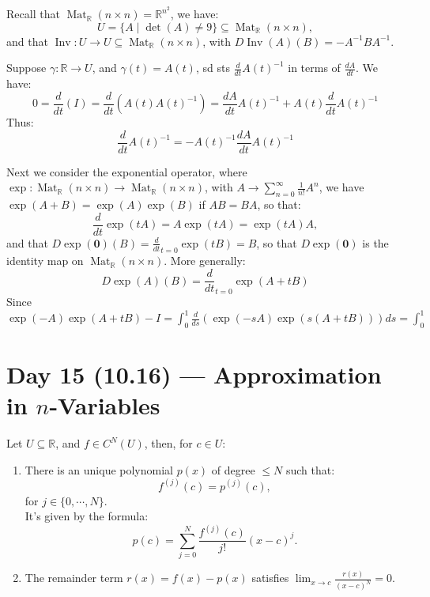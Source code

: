 \documentclass[11pt]{article}
\newenvironment{theorem}[1]{\begin{thmbox}{#1}{}}{\end{thmbox}}
\newenvironment{example}[1]{\begin{exbox}{#1}{}}{\end{exbox}}
\theoremstyle{quiet}
\theoremstyle{quietremark}
\begin{document}
Recall that $\operatorname{Mat}_\mathbb{R}(n\times n)=\mathbb{R}^{n^2}$, we have:
\[
U=\{A\mid\det(A)\ne 9\}\subseteq\operatorname{Mat}_\mathbb{R}(n\times n),
\]
and that $\operatorname{Inv}:U\to U\subseteq\operatorname{Mat}_\mathbb{R}(n\times n)$, with $D\operatorname{Inv}(A)(B)=-A^{-1}BA^{-1}$.
\begin{example}{}
Suppose $\gamma:\mathbb{R}\to U$, and $\gamma(t)=A(t)$, sd sts $\frac{d}{dt}A(t)^{-1}$ in terms of $\frac{dA}{dt}$.
We have:
\[
0=\frac{d}{dt}(I)=\frac{d}{dt}(A(t)A(t)^{-1})=\frac{dA}{dt}A(t)^{-1}+A(t)\frac{d}{dt}A(t)^{-1}
\]
Thus:
\[
\frac{d}{dt}A(t)^{-1}=-A(t)^{-1}\frac{dA}{dt}A(t)^{-1}
\]
\end{example}
Next we consider the exponential operator, where $\operatorname{exp}:\operatorname{Mat}_\mathbb{R}(n\times n)\to\operatorname{Mat}_\mathbb{R}(n\times n)$, with $A\to\sum_{n=0}^\infty\frac{1}{n!}A^n$, we have $\operatorname{exp}(A+B)=\operatorname{exp}(A)\operatorname{exp}(B)$ if $AB=BA$, so that:
\[
\frac{d}{dt}\operatorname{exp}(tA)=A\operatorname{exp}(tA)=\operatorname{exp}(tA)A,
\]
and that $D\operatorname{exp}(\mathbf{0})(B)=\frac{d}{dt}_{t=0}\operatorname{exp}(tB)=B$, so that $D\operatorname{exp}(\mathbf{0})$ is the identity map on $\operatorname{Mat}_\mathbb{R}(n\times n)$. More generally:
\[
D\operatorname{exp}(A)(B)=\frac{d}{dt}_{t=0}\operatorname{exp}(A+tB)
\]
Since $\operatorname{exp}(-A)\operatorname{exp}(A+tB)-I=\int_0^1\frac{d}{ds}(\operatorname{exp}(-sA)\operatorname{exp}(s(A+tB)))ds=\int_0^1$

\newpage
\section{Day 15 (10.16) --- Approximation in $n$-Variables}
\begin{theorem}
Let $U\subseteq\mathbb{R}$, and $f\in C^N(U)$, then, for $c\in U$:
\begin{enumerate}
\item There is an unique polynomial $p(x)$ of degree $\le N$ such that:
\[
f^{(j)}(c)=p^{(j)}(c),
\]
for $j\in\{0,\cdots,N\}.$\\
It's given by the formula:
\[
p(c)=\sum_{j=0}^N\frac{f^{(j)}(c)}{j!}(x-c)^j.
\]
\item The remainder term $r(x)=f(x)-p(x)$ satisfies $\displaystyle\lim_{x\to c}\frac{r(x)}{(x-c)^N}=0.$
\end{enumerate}
\end{theorem}
\end{document}
